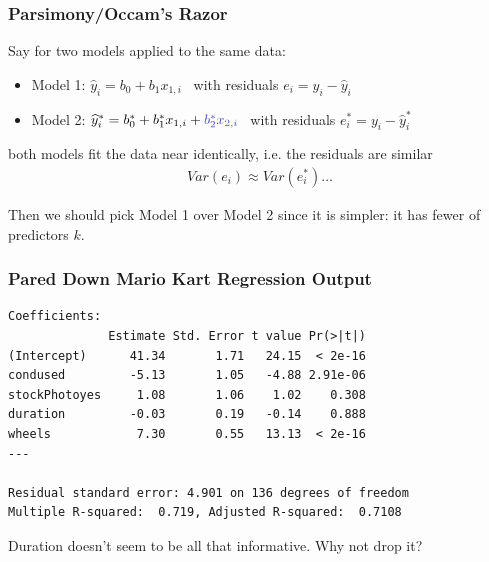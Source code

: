 \documentclass[handout]{beamer}
\newcommand{\blue}[1]{\textcolor{blue2}{#1}}
\begin{document}
\begin{frame}[fragile]
\frametitle{Parsimony/Occam's Razor}
%
%
Say for two models applied to the same data:
\begin{itemize}
\pause\item Model 1: $\widehat{y}_i = b_0 + b_1 x_{1,i}$ \ with residuals $e_i = y_i - \widehat{y}_i$
\pause\item Model 2: $\widehat{y}_i^* = b_0^* + b_1^* x_{1,i} + \blue{b_2^* x_{2,i}}$ \ with residuals $e_i^* = y_i - \widehat{y}_i^*$
\end{itemize}

\pause both models fit the data near identically, i.e. the residuals are similar
\begin{eqnarray*}
Var(e_i) \approx Var(e_i^{*}) \ldots
\end{eqnarray*}

\pause Then we should pick Model 1 over Model 2 since it is \blue{simpler}: it has fewer of predictors $k$.

\end{frame}


\begin{frame}[fragile]
\frametitle{Pared Down Mario Kart Regression Output}

\begin{small}
\begin{verbatim}
Coefficients:
              Estimate Std. Error t value Pr(>|t|)    
(Intercept)      41.34       1.71   24.15  < 2e-16
condused         -5.13       1.05   -4.88 2.91e-06
stockPhotoyes     1.08       1.06    1.02    0.308    
duration         -0.03       0.19   -0.14    0.888    
wheels            7.30       0.55   13.13  < 2e-16
---

Residual standard error: 4.901 on 136 degrees of freedom
Multiple R-squared:  0.719,	Adjusted R-squared:  0.7108 
\end{verbatim}
\end{small}

\pause Duration doesn't seem to be all that informative.  Why not drop it?

\end{frame}
\end{document}

